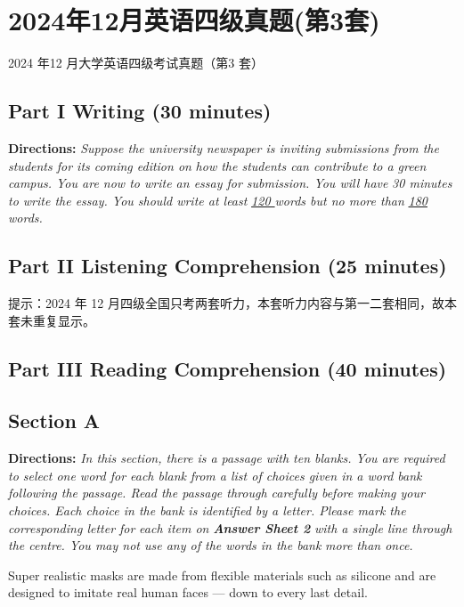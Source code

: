 \documentclass[UTF8,11pt]{ctexart}
\begin{document}
\section*{2024年12月英语四级真题(第3套)}
2024 年12 月大学英语四级考试真题（第3 套）


\subsection*{\textbf{Part I Writing} \textbf{(30 minutes)}}


\textbf{Directions:} \textit{Suppose the university newspaper is inviting submissions from the students for its coming edition on} \textit{how the students can contribute to a green campus. You are now to write an essay for submission. You will have} \textit{30 minutes to write the essay. You should write at least }\textit{\uline{120 }}\textit{words but no more than }\textit{\uline{180 }}\textit{words.}


\subsection*{\textbf{Part II} \textbf{Listening Comprehension} \textbf{(25 minutes)}}


提示：2024 年 12 月四级全国只考两套听力，本套听力内容与第一二套相同，故本套未重复显示。


\subsection*{\textbf{Part III Reading Comprehension (40 minutes)}}


\subsection*{\textbf{Section A}}


\textbf{Directions:} \textit{In this section, there is a passage with ten blanks. You are required to select one word for each blank} \textit{from a list of choices given in a word bank following the passage. Read the passage through carefully before} \textit{making your choices. Each choice in the bank is identified by a letter. Please mark the corresponding letter for} \textit{each item on }\textbf{\textit{Answer Sheet 2}}\textit{ with a single line through the centre. You may not use any of the words in the bank} \textit{more than once.}


Super realistic masks are made from flexible materials such as silicone and are designed to imitate real human faces — down to every last detail.
\end{document}
